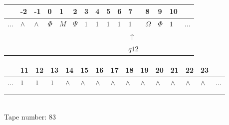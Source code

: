 \documentclass[11pt]{article}
\begin{document}
\begin{table}[H]
\centering
\begin{tabular}{lllllllllllllll}
 & -2 & -1 & 0 & 1 & 2 & 3 & 4 & 5 & 6 & 7 & 8 & 9 & 10 & \\
\hline
$...$ & \multicolumn{1}{|l|}{$\wedge$} & \multicolumn{1}{|l|}{$\wedge$} & \multicolumn{1}{|l|}{$\Phi$} & \multicolumn{1}{|l|}{$M$} & \multicolumn{1}{|l|}{$\Psi$} & \multicolumn{1}{|l|}{$1$} & \multicolumn{1}{|l|}{$1$} & \multicolumn{1}{|l|}{$1$} & \multicolumn{1}{|l|}{$1$} & \multicolumn{1}{|l|}{$1$} & \multicolumn{1}{|l|}{$\Omega$} & \multicolumn{1}{|l|}{$\Phi$} & \multicolumn{1}{|l|}{$1$} & $...$\\
\hline
&  &  &  &  &  &  &  &  &  & $\uparrow$ &  &  &  &  \\
&  &  &  &  &  &  &  &  &  & $ q12 $ &  &  &  &  \\
\end{tabular}
\begin{tabular}{lllllllllllllll}
 & 11 & 12 & 13 & 14 & 15 & 16 & 17 & 18 & 19 & 20 & 21 & 22 & 23 & \\
\hline
$...$ & \multicolumn{1}{|l|}{$1$} & \multicolumn{1}{|l|}{$1$} & \multicolumn{1}{|l|}{$1$} & \multicolumn{1}{|l|}{$\wedge$} & \multicolumn{1}{|l|}{$\wedge$} & \multicolumn{1}{|l|}{$\wedge$} & \multicolumn{1}{|l|}{$\wedge$} & \multicolumn{1}{|l|}{$\wedge$} & \multicolumn{1}{|l|}{$\wedge$} & \multicolumn{1}{|l|}{$\wedge$} & \multicolumn{1}{|l|}{$\wedge$} & \multicolumn{1}{|l|}{$\wedge$} & \multicolumn{1}{|l|}{$\wedge$} & $...$\\
\hline
&  &  &  &  &  &  &  &  &  &  &  &  &  &  \\
&  &  &  &  &  &  &  &  &  &  &  &  &  &  \\
\end{tabular}
\\
Tape number: 83
\noindent\makebox[\linewidth]{\hdashrule{\textwidth}{1pt}{1pt}}\end{table}
\clearpage
\end{document}
